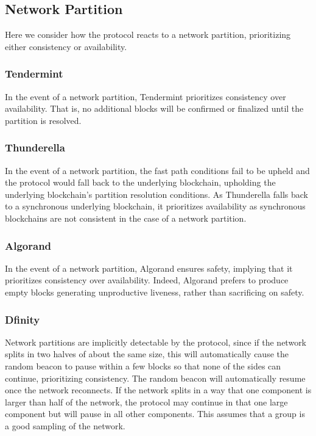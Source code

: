 \documentclass[10pt,journal,compsoc]{IEEEtran}
\begin{document}
\subsection{Network Partition}
Here we consider how the protocol reacts to a network partition, prioritizing either consistency or availability. 

\subsubsection{Tendermint} In the event of a network partition, Tendermint prioritizes consistency over availability. That is, no additional blocks will be confirmed or finalized until the partition is resolved. 

\subsubsection{Thunderella} In the event of a network partition, the fast path conditions fail to be upheld and the protocol would fall back to the underlying blockchain, upholding the underlying blockchain's partition resolution conditions. As Thunderella falls back to a synchronous underlying blockchain, it prioritizes availability as synchronous blockchains are not consistent in the case of a network partition.   

\subsubsection{Algorand}
In the event of a network partition, Algorand ensures safety, implying that it prioritizes consistency over availability. Indeed, Algorand prefers to produce empty blocks generating unproductive liveness, rather than sacrificing on safety.

\subsubsection{Dfinity} Network partitions are implicitly detectable by the protocol, since if the network splits in two halves of about the same size, this will automatically cause the random beacon to pause within a few blocks so that none of the sides can continue, prioritizing consistency. The random beacon will automatically resume once the network reconnects. If the network splits in a way that one component is larger than half of the network, the protocol may continue in that one large component but will pause in all other components. This assumes that a group is a good sampling of the network. 
\end{document}
